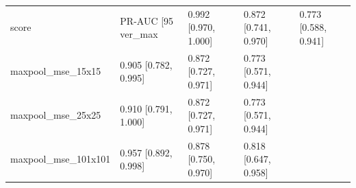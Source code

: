 \begin{tabular}{llll}
\toprule
score & PR-AUC [95%
\midrule
ver_max & 0.992 [0.970, 1.000] & 0.872 [0.741, 0.970] & 0.773 [0.588, 0.941] \\
maxpool_mse_15x15 & 0.905 [0.782, 0.995] & 0.872 [0.727, 0.971] & 0.773 [0.571, 0.944] \\
maxpool_mse_25x25 & 0.910 [0.791, 1.000] & 0.872 [0.727, 0.971] & 0.773 [0.571, 0.944] \\
maxpool_mse_101x101 & 0.957 [0.892, 0.998] & 0.878 [0.750, 0.970] & 0.818 [0.647, 0.958] \\
\bottomrule
\end{tabular}
